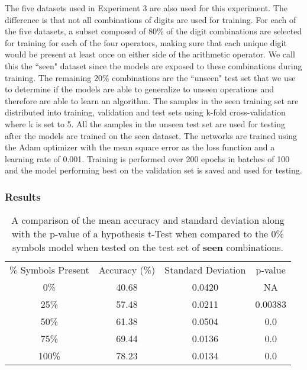 The five datasets used in Experiment 3 are also used for this experiment. The difference is that not all combinations of digits are used for training. For each of the five datasets, a subset composed of 80\% of the digit combinations are selected for training for each of the four operators, making sure that each unique digit would be present at least once on either side of the arithmetic operator. We call this the ``seen" dataset since the models are exposed to these combinations during training. The remaining 20\% combinations are the ``unseen" test set that we use to determine if the models are able to generalize to unseen operations and therefore are able to learn an algorithm. The samples in the seen training set are distributed into training, validation and test sets using k-fold cross-validation where k is set to 5. All the samples in the unseen test set are used for testing after the models are trained on the seen dataset. The networks are trained using the Adam optimizer with the mean square error as the loss function and a learning rate of 0.001. Training is performed over 200 epochs in batches of 100 and the model performing best on the validation set is saved and used for testing.

\subsubsection{Results}

\begin{table}[p!]
	\center
	\caption{A comparison of the mean accuracy and standard deviation along with the p-value of a hypothesis t-Test when compared to the 0\% symbols model when tested on the test set of \textbf{seen} combinations.}
	\label{tab:experiment-4-results-table-seen}
	\begin{tabular}{ |c|c|c|c| } 
		\hline
		\% Symbols Present & Accuracy (\%) & Standard Deviation  & p-value\\ 
		0\% & 40.68 & 0.0420 & NA \\  
		25\% & 57.48 & 0.0211 & 0.00383\\  
		50\% & 61.38 & 0.0504 & 0.0 \\  
		75\% & 69.44 & 0.0136 & 0.0\\  
		100\% & 78.23 & 0.0134 & 0.0\\  
		\hline
	\end{tabular}
\end{table}

